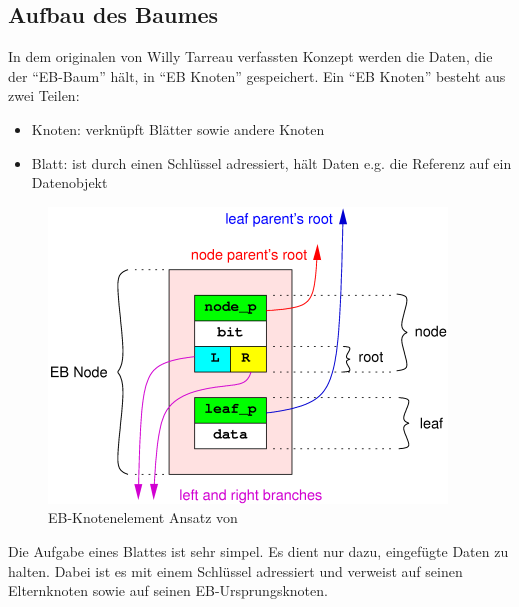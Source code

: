 \documentclass[a4paper,11pt,oneside,%
headsepline,												%
footsepline,												%
bibtotocnumbered									%
]{scrreprt}
\begin{document}
\subsection{Aufbau des Baumes}
In dem originalen von Willy Tarreau verfassten Konzept\autocite[Absatz Definitions]{Tarreau} werden die Daten, die der \enquote{EB-Baum} hält, in \enquote{EB Knoten}
gespeichert. Ein \enquote{EB Knoten} besteht aus zwei Teilen:
\begin{itemize}
\item Knoten: verknüpft Blätter sowie andere Knoten
\item Blatt: ist durch einen Schlüssel adressiert, hält Daten e.g. die Referenz auf ein Datenobjekt
\end{itemize}


\begin{figure}[h!]
  \begin{center}
    \includegraphics[width=.5\linewidth]{bilder/Ebnode.png}
  \end{center}
 \caption{EB-Knotenelement Ansatz von \autocite{Tarreau}}
\end{figure}
Die Aufgabe eines Blattes ist sehr simpel. Es dient nur dazu, eingefügte Daten zu halten. Dabei ist es mit einem Schlüssel adressiert und verweist auf seinen Elternknoten sowie auf seinen EB-Ursprungsknoten.\\
\end{document}
